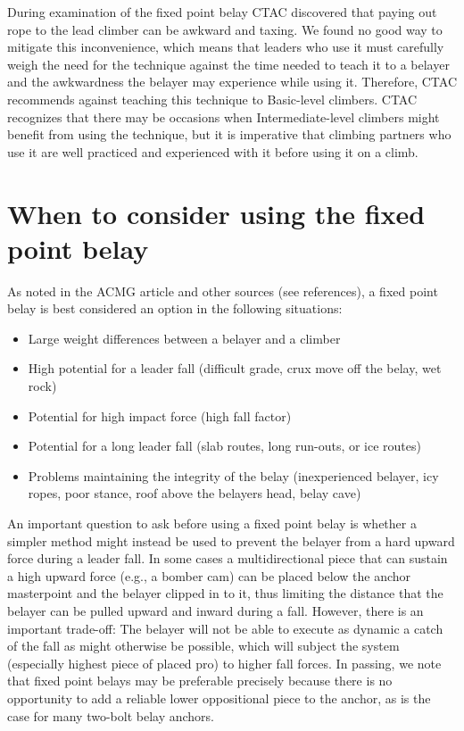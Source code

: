\documentclass[nonacm,acmtog]{acmart}
\begin{document}
During examination of the fixed point belay CTAC discovered that paying out
rope to the lead climber can be awkward and taxing. We found no good way to
mitigate this inconvenience, which means that leaders who use it must carefully
weigh the need for the technique against the time needed to teach it to a
belayer and the awkwardness the belayer may experience while using it.
Therefore, CTAC recommends against teaching this technique to Basic-level
climbers. CTAC recognizes that there may be occasions when Intermediate-level
climbers might benefit from using the technique, but it is imperative that
climbing partners who use it are well practiced and experienced with it before
using it on a climb.

\section{When to consider using the fixed point belay}
As noted in the ACMG article and other sources (see references), a fixed point
belay is best considered an option in the following situations:

\begin{itemize}
\item Large weight differences between a belayer and a climber
\item High potential for a leader fall (difficult grade, crux move off the
belay, wet rock)
\item Potential for high impact force (high fall factor)
\item Potential for a long leader fall (slab routes, long run-outs, or ice
routes)
\item Problems maintaining the integrity of the belay (inexperienced belayer,
icy ropes, poor stance, roof above the belayers head, belay cave)
\end{itemize}

An important question to ask before using a fixed point belay is whether a
simpler method might instead be used to prevent the belayer from a hard upward
force during a leader fall. In some cases a multidirectional piece that can
sustain a high upward force (e.g., a bomber cam) can be placed below the anchor
masterpoint and the belayer clipped in to it, thus limiting the distance that
the belayer can be pulled upward and inward during a fall. However, there is an
important trade-off: The belayer will not be able to execute as dynamic a catch
of the fall as might otherwise be possible, which will subject the system
(especially highest piece of placed pro) to higher fall forces. In passing, we
note that fixed point belays may be preferable precisely because there is no
opportunity to add a reliable lower oppositional piece to the anchor, as is the
case for many two-bolt belay anchors.
\end{document}

